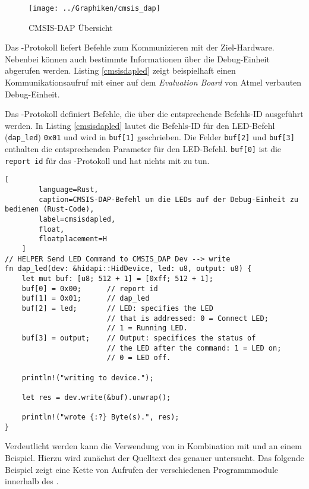 	\begin{figure}[h]
	    \centering
	    \caption{CMSIS-DAP Übersicht}
	    \label{fig:cmsisdapoverview}
	    \texttt{[image: ../Graphiken/cmsis\_dap]}
	\end{figure}

	Das -Protokoll liefert Befehle zum Kommunizieren mit der Ziel-Hardware. Nebenbei können auch bestimmte
	Informationen über die Debug-Einheit abgerufen werden. Listing \ref{cmsisdapled} zeigt beispielhaft einen
	Kommunikationsaufruf mit einer auf dem \textit{Evaluation Board} von Atmel verbauten Debug-Einheit.

	Das -Protokoll definiert Befehle, die über die entsprechende Befehls-ID ausgeführt werden.
	In Listing \ref{cmsisdapled} lautet die Befehls-ID für den LED-Befehl (\texttt{dap\_led}) \texttt{0x01} und wird in
	\texttt{buf[1]} geschrieben.
	Die Felder \texttt{buf[2]} und \texttt{buf[3]} enthalten die entsprechenden Parameter für den LED-Befehl.
	\texttt{buf[0]} ist die \texttt{report id} für das -Protokoll und hat nichts mit  zu tun.

	\newpage

	\begin{lstlisting}[
	    language=Rust,
	    caption=CMSIS-DAP-Befehl um die LEDs auf der Debug-Einheit zu bedienen (Rust-Code),
	    label=cmsisdapled,
	    float,
	    floatplacement=H
	]
// HELPER Send LED Command to CMSIS_DAP Dev --> write
fn dap_led(dev: &hidapi::HidDevice, led: u8, output: u8) {
    let mut buf: [u8; 512 + 1] = [0xff; 512 + 1];
    buf[0] = 0x00;      // report id
    buf[1] = 0x01;      // dap_led
    buf[2] = led;       // LED: specifies the LED
                        // that is addressed: 0 = Connect LED;
                        // 1 = Running LED.
    buf[3] = output;    // Output: specifices the status of
                        // the LED after the command: 1 = LED on;
                        // 0 = LED off.

    println!("writing to device.");

    let res = dev.write(&buf).unwrap();

    println!("wrote {:?} Byte(s).", res);
}
	\end{lstlisting}

	Verdeutlicht werden kann die Verwendung von  in Kombination mit  und  an einem Beispiel. Hierzu
	wird zunächst der Quelltext des  genauer untersucht.
	Das folgende Beispiel zeigt eine Kette von Aufrufen der verschiedenen Programmmodule innerhalb des .

